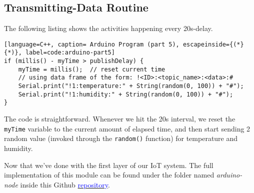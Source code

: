\subsection{Transmitting-Data Routine}
\label{transmitting-data}
The following listing shows the activities happening every 20s-delay.
\begin{lstlisting}[language=C++, caption= Arduino Program (part 5), escapeinside={(*}{*)}, label=code:arduino-part5]
if (millis() - myTime > publishDelay) {
    myTime = millis();  // reset current time
    // using data frame of the form: !<ID>:<topic_name>:<data>:#
    Serial.print("!1:temperature:" + String(random(0, 100)) + "#");
    Serial.print("!1:humidity:" + String(random(0, 100)) + "#");
}
\end{lstlisting}
The code is straightforward. Whenever we hit the 20s interval, we reset the \texttt{myTime} variable to the current amount of elapsed time, and then start sending 2 random value (invoked through the \texttt{random()} function) for temperature and humidity.

Now that we've done with the first layer of our IoT system. The full implementation of this module can be found under the folder named \textit{arduino-node} inside this Github \href{https://github.com/hescul/adafruit-simple-iot}{\textcolor{blue}{repository}}.
\clearpage